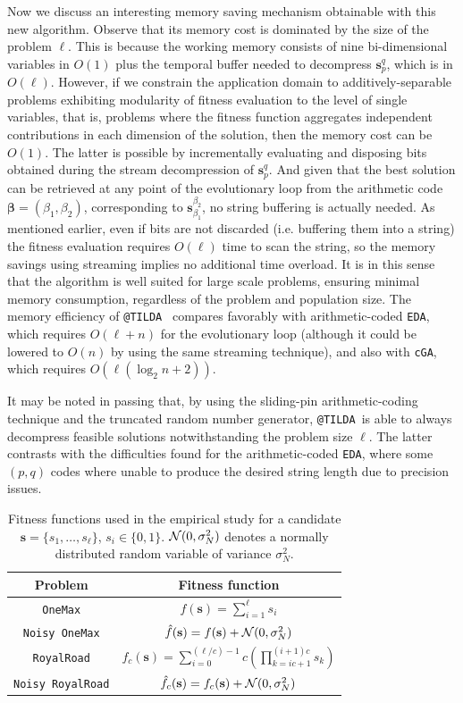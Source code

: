 \documentclass{sig-alternate}
\makeatletter
\newcommand{\bs}{{\mathbf s}}
\newcommand{\bbeta}{{\boldsymbol \beta}}
\newcommand{\cGA}{\texttt{cGA}}
\newcommand{\EDA}{\texttt{EDA}}
\newcommand{\TILDAC}{\texttt{@TILDA}}
\newcommand{\onemax}{\texttt{OneMax}}
\newcommand{\rroad}{\texttt{RoyalRoad}}
\newcommand{\noisy}{\texttt{Noisy~}}
\newcommand{\gauss}[2]{{\cal N}(#1, #2)}
\makeatother
\begin{document}
Now we discuss an interesting memory saving mechanism obtainable with this new algorithm. Observe that its memory cost is dominated by the size of the problem $\ell$. This is because the working memory consists of nine bi-dimensional variables in $O(1)$ plus the temporal buffer needed to decompress $\bs_p^q$, which is in $O(\ell)$. However, if we constrain the application domain to additively-separable problems exhibiting modularity of fitness evaluation to the level of single variables, that is, problems where the fitness function aggregates independent contributions in each dimension of the solution, then the memory cost can be $O(1)$. The latter is possible by incrementally evaluating and disposing bits obtained during the stream decompression of $\bs_p^q$. And given that the best solution can be retrieved at any point of the evolutionary loop from the arithmetic code $\bbeta=(\beta_1,\beta_2)$, corresponding to $\bs_{\beta_1}^{\beta_2}$, no string buffering is actually needed. As mentioned earlier, even if bits are not discarded (i.e. buffering them into a string) the fitness evaluation requires $O(\ell)$ time to scan the string, so the memory savings using streaming implies no additional time overload. It is in this sense that the algorithm is well suited for large scale problems, ensuring minimal memory consumption, regardless of the problem and population size. The memory efficiency of \TILDAC~ compares favorably with arithmetic-coded \EDA\cite{Suwannik08}, which requires $O(\ell+n)$ for the evolutionary loop (although it could be lowered to $O(n)$ by using the same streaming technique), and also with \cGA\cite{Harik99}, which requires $O(\ell(\log_2 n+2))$. 

It may be noted in passing that, by using the sliding-pin arithmetic-coding technique and the truncated random number generator, \TILDAC~is able to always decompress feasible solutions notwithstanding the problem size $\ell$. The latter contrasts with the difficulties found for the arithmetic-coded \EDA, where some $(p,q)$ codes where unable to produce the desired string length due to precision issues\cite{Suwannik08}.

\begin{table}
	\centering
	{\footnotesize
	\renewcommand{\arraystretch}{1.6}
		\begin{tabular}{|c|c|}
			\hline
			\textbf{Problem} & \textbf{Fitness function} \\
			\hline \hline 
			\onemax & $f(\bs) = \sum_{i=1}^\ell s_i$ \\
			\hline
			\noisy \onemax & $\hat{f}(\bs) = f(\bs) + \gauss{0}{\sigma^2_N}$ \\
			\hline
			\rroad & $f_c(\bs) = \sum_{i=0}^{(\ell/c)-1} c\left(\prod_{k=ic+1}^{(i+1)c} s_k \right)$ \\
			\hline
			\noisy \rroad & $\hat{f}_c(\bs) = f_c(\bs)+\gauss{0}{\sigma^2_N}$\\
			\hline 
		\end{tabular}
	}
	\caption{Fitness functions used in the empirical study for a candidate $\bs=\{s_1,\ldots,s_{\ell}\}$, $s_i \!\!\in\!\! \{0,1\}$. $\gauss{0}{\sigma^2_N}$ denotes a normally distributed random variable of variance $\sigma^2_N$.} 
	\label{tab:fitfun}		
\end{table}
\end{document}
